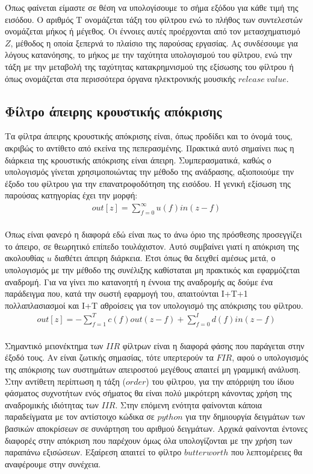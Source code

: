 \documentclass[breaklines=true, 12pt]{article}
\begin{document}
Όπως φαίνεται είμαστε σε θέση να υπολογίσουμε το σήμα εξόδου για κάθε τιμή της εισόδου.
Ο αριθμός Τ ονομάζεται τάξη του φίλτρου ενώ το πλήθος των συντελεστών ονομάζεται μήκος ή
μέγεθος. Οι έννοιες αυτές προέρχονται από τον μετασχηματισμό \(Z\), μέθοδος η οποία  ξεπερνά
το πλαίσιο της παρούσας εργασίας. Aς συνδέσουμε για λόγους κατανόησης, το μήκος με την
ταχύτητα υπολογισμού του φίλτρου, ενώ την τάξη με την μεταβολή της ταχύτητας κατακρημνισμού της
εξίσωσης του φίλτρου ή όπως ονομάζεται στα περισσότερα όργανα ηλεκτρονικής μουσικής
\(release\ value\).
\subsection{Φίλτρο άπειρης κρουστικής απόκρισης}
\label{sec:org6db6576}
Τα φίλτρα άπειρης κρουστικής απόκρισης είναι, όπως προδίδει και το όνομά τους,
ακριβώς το αντίθετο από εκείνα της πεπερασμένης. Πρακτικά αυτό σημαίνει
πως η διάρκεια της κρουστικής απόκρισης είναι άπειρη. Συμπερασματικά, καθώς ο
υπολογισμός γίνεται χρησιμοποιώντας την μέθοδο της ανάδρασης, αξιοποιούμε την
έξοδο του φίλτρου για την επανατροφοδότηση της εισόδου. Η γενική εξίσωση της
παρούσας κατηγορίας έχει την μορφή:
\begin{equation}
\begin{align}
out[z] = \sum_{f=0}^{\infty}u(f)in(z-f) \\
\end{align}
\end{equation}

Όπως είναι φανερό η διαφορά εδώ είναι πως το άνω όριο της πρόσθεσης προσεγγίζει
το άπειρο, σε θεωρητικό επίπεδο τουλάχιστον. Αυτό συμβαίνει γιατί η απόκριση
της ακολουθίας \(u\) διαθέτει άπειρη διάρκεια. Έτσι όπως θα δειχθεί αμέσως μετά,
ο υπολογισμός με την μέθοδο της συνέλιξης καθίσταται μη πρακτικός και εφαρμόζεται
αναδρομή. Για να γίνει πιο κατανοητή η έννοια της αναδρομής ας δούμε ένα
παράδειγμα που, κατά την σωστή εφαρμογή του, απαιτούνται I+T+1
πολλαπλασιασμοί και I+T αθροίσεις για τον υπολογισμό της απόκρισης του φίλτρου.
\begin{equation}
\begin{align}
out[z] = - \sum_{f=1}^{T}c(f)out(z-f) + \sum_{f=0}^{I}d(f)in(z-f) \\
\end{align}
\end{equation}

Σημαντικό μειονέκτημα των \(IIR\) φίλτρων είναι η διαφορά φάσης που παράγεται στην
έξοδό τους. Αν είναι ζωτικής σημασίας, τότε υπερτερούν τα \(FIR\), αφού ο υπολογισμός
της απόκρισης των συστημάτων απειροστού μεγέθους απαιτεί μη γραμμική ανάλυση.
Στην αντίθετη περίπτωση η τάξη (\(order\)) του φίλτρου, για την απόρριψη του ίδιου
φάσματος συχνοτήτων ενός σήματος θα είναι πολύ μικρότερη κάνοντας χρήση της
αναδρομικής ιδιότητας των \(IIR\). Στην επόμενη ενότητα φαίνονται κάποια παραδείγματα
με τον αντίστοιχο κώδικα σε \(python\) για την δημιουργία δειγμάτων των βασικών
αποκρίσεων σε συνάρτηση του αριθμού δειγμάτων. Αρχικά φαίνονται έντονες
διαφορές στην απόκριση που παρέχουν όμως όλα υπολογίζονται με την χρήση των
παραπάνω εξισώσεων. Εξαίρεση απαιτεί το φίλτρο \(butterworth\) που
λεπτομέρειες θα αναφέρουμε στην συνέχεια.
\end{document}
